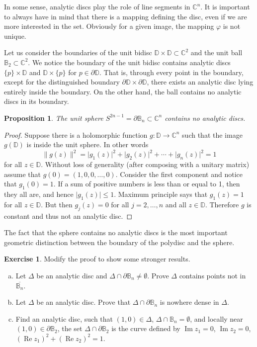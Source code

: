\documentclass[12pt,openany]{book}
\renewcommand{\Re}{\operatorname{Re}}
\renewcommand{\Im}{\operatorname{Im}}
\newcommand{\sabs}[1]{\lvert {#1} \rvert}
\newcommand{\snorm}[1]{\lVert {#1} \rVert}
\newcommand{\C}{{\mathbb{C}}}
\newcommand{\D}{{\mathbb{D}}}
\newcommand{\bB}{{\mathbb{B}}}
\newcommand{\bD}{{\mathbb{D}}}
\theoremstyle{plain}
\newtheorem{prop}[thm]{Proposition}
\theoremstyle{remark}
\theoremstyle{definition}
\newenvironment{exbox}{%
    \def\FrameCommand{\vrule width 1pt \relax\hspace {10pt}}%
    \MakeFramed {\advance \hsize -\width \FrameRestore }%
}{%
    \endMakeFramed
}
\newenvironment{exparts}{%
    \leavevmode\begin{enumerate}[a),noitemsep,topsep=0pt,parsep=0pt,partopsep=0pt]
}{%
    \end{enumerate}
}
\theoremstyle{exercise}
\newtheorem{exercise}{Exercise}[section]
\theoremstyle{example}
\begin{document}
In some sense, analytic discs play the role of line segments in $\C^n$.  It
is important to always have in mind that there is a mapping defining the
disc, even if we are more interested in the set.  Obviously for a given
image, the mapping $\varphi$ is not unique.

Let us consider the boundaries of 
the unit bidisc $\bD \times \bD \subset \C^2$
and the unit ball $\bB_2 \subset \C^2$.  We notice the boundary
of the unit bidisc contains analytic discs $\{p\} \times \bD$
and $\bD \times \{p\}$ for $p \in \partial \bD$.  That is, through
every point in the boundary, except for the distinguished
boundary $\partial \D \times \partial \D$, there exists an analytic disc
lying entirely inside the boundary.  On the other hand, the ball
contains no analytic discs in its boundary.

\begin{prop}
%
The unit sphere $S^{2n-1} = \partial \bB_n \subset \C^n$ 
contains no analytic discs.
\end{prop}

\begin{proof}
Suppose there is a holomorphic function $g \colon \D \to \C^n$
such that the image $g(\D)$ is inside the unit sphere.  In other words
\begin{equation*}
\snorm{g(z)}^2 = \sabs{g_1(z)}^2 + \sabs{g_2(z)}^2 + \cdots + \sabs{g_n(z)}^2 = 1
\end{equation*}
for all $z \in \D$.  Without loss of generality (after composing with a
unitary matrix) assume that
$g(0) = (1,0,0,\ldots,0)$.  Consider the first component
and notice that $g_1(0) = 1$.  If a sum of
positive numbers is less than or equal to 1,
then they all are, and hence $\sabs{g_1(z)} \leq 1$.  Maximum principle
says
that $g_1(z) = 1$ for all $z \in \D$.  But then $g_j(z) = 0$
for all $j=2,\ldots,n$ and all $z \in \D$.  Therefore $g$ is constant and
thus not an analytic disc.
\end{proof}

The fact that the sphere contains no analytic discs
is the most important geometric distinction between the boundary of
the polydisc and the sphere.

\begin{exbox}
\begin{exercise}
Modify the proof to show some stronger results.
\begin{exparts}
\item
Let $\Delta$ be an analytic disc
and $\Delta \cap \partial \bB_n \not= \emptyset$.
Prove $\Delta$ contains points not in
$\overline{\bB_n}$.
\item
Let $\Delta$ be an analytic disc.
Prove that $\Delta \cap \partial \bB_n$ is nowhere dense in $\Delta$.
\item
Find an analytic disc, such that $(1,0) \in \Delta$, $\Delta \cap \bB_n =
\emptyset$, and 
locally near
$(1,0) \in \partial \bB_2$, the set
$\Delta \cap \partial \bB_2$ is the
curve defined by $\Im z_1=0$, $\Im z_2=0$,
${(\Re z_1)}^2+ {(\Re z_2)}^2 = 1$.
\end{exparts}
\end{exercise}
\end{exbox}
\end{document}
